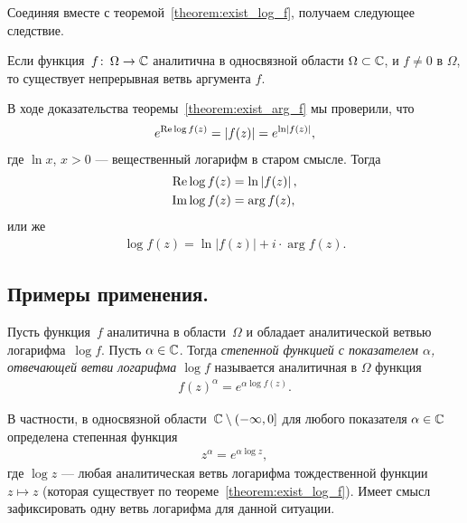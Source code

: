 \documentclass[../complex-analysis.tex]{subfiles}
\begin{document}
Соединяя вместе с теоремой~\ref{theorem:exist_log_f}, получаем следующее следствие.

\begin{crly}
 Если функция~$ f\colon\,\Omega\to\mathbb{C} $ аналитична в односвязной области $ \Omega \subset \mathbb{C}  $, и $ f \neq 0 $ в $ \Omega $, то существует непрерывная ветвь аргумента $ f $.
\end{crly}

\begin{remrk}
 В ходе доказательства теоремы~\ref{theorem:exist_arg_f} мы проверили, что
 \begin{align*}
  e^{\operatorname{Re} \log f(z)} = \left| f(z) \right| = e^{\ln \left| f(z) \right|},
 \end{align*} где $ \ln x $, $ x > 0 $ --- вещественный логарифм в старом смысле. Тогда
 \begin{align*}
  \operatorname{Re} \log f(z) &= \ln \left| f(z) \right|, \\
  \operatorname{Im} \log f(z) &= \arg f(z),
 \end{align*} или же
 \begin{align*}
  \log f(z) = \ln \left| f(z) \right| + i \cdot \arg f(z).
 \end{align*}
\end{remrk}

\subsection{Примеры применения.}

\begin{df}
 Пусть функция~$ f $ аналитична в области~$ \Omega $ и обладает аналитической ветвью логарифма~$ \log f $. Пусть $ \alpha\in\mathbb{C} $. Тогда \emph{степенной функцией с показателем $ \alpha $, отвечающей ветви логарифма $ \log f $} называется аналитичная в $ \Omega $ функция
 \begin{align*}
  f(z)^{\alpha} = e^{\alpha \log f(z)}.
 \end{align*}
\end{df}

В частности, в односвязной области~$ \mathbb{C} \setminus \left(-\infty, 0\right]$ для любого показателя $ \alpha \in \mathbb{C} $ определена степенная функция
\begin{align*}
 z^{\alpha} = e^{\alpha \log z},
\end{align*} где $ \log z $ --- любая аналитическая ветвь логарифма тождественной функции $ z \mapsto z $ (которая существует по теореме~\ref{theorem:exist_log_f}). Имеет смысл зафиксировать одну ветвь логарифма для данной ситуации.
\end{document}
